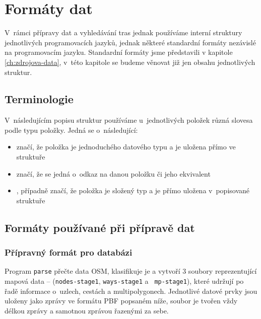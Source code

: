 \chapter{Formáty dat}
\label{ch:formaty-dat}
V~rámci přípravy dat a vyhledávání tras jednak používáme interní struktury
jednotlivých programovacích jazyků, jednak některé standardní formáty nezávislé
na programovacím jazyku. Standardní formáty jsme představili v kapitole
\ref{ch:zdrojova-data}, v~této kapitole se budeme věnovat již jen obsahu
jednotlivých struktur.


\section{Terminologie}
V~následujícím popisu struktur používáme u~jednotlivých položek různá slovesa
podle typu položky. Jedná se o~následující:
\begin{itemize}
	\item {} značí, že položka je jednoduchého datového typu a je
		uložena přímo ve struktuře
	\item {} značí, že se jedná o~odkaz na danou položku či jeho
		ekvivalent
	\item {}, případně  značí, že položka je
		složený typ a je přímo uložena v~popisované struktuře
\end{itemize}

\section{Formáty používané při přípravě dat}
\label{ch:formaty-dat:priprava}
\subsection{Přípravný formát pro databázi}
Program {\tt parse} přečte data OSM, klasifikuje je a vytvoří 3 soubory
reprezentující mapová data -- ({\tt nodes-stage1}, {\tt ways-stage1} a {\tt
mp-stage1}), které udržují po řadě
informace o~uzlech, cestách a multipolygonech. Jednotlivé datové prvky jsou
uloženy jako zprávy ve formátu PBF popsaném níže, soubor je tvořen vždy délkou
zprávy a samotnou zprávou řazenými za sebe. 

